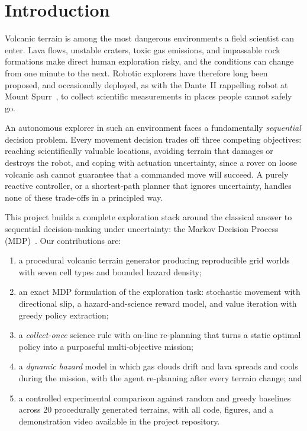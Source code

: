 \documentclass[conference]{IEEEtran}
\begin{document}
\section{Introduction}

Volcanic terrain is among the most dangerous environments a field scientist can enter. Lava flows, unstable craters, toxic gas emissions, and impassable rock formations make direct human exploration risky, and the conditions can change from one minute to the next. Robotic explorers have therefore long been proposed, and occasionally deployed, as with the Dante~II rappelling robot at Mount Spurr~\cite{bares1999dante}, to collect scientific measurements in places people cannot safely go.

An autonomous explorer in such an environment faces a fundamentally \emph{sequential} decision problem. Every movement decision trades off three competing objectives: reaching scientifically valuable locations, avoiding terrain that damages or destroys the robot, and coping with actuation uncertainty, since a rover on loose volcanic ash cannot guarantee that a commanded move will succeed. A purely reactive controller, or a shortest-path planner that ignores uncertainty, handles none of these trade-offs in a principled way.

This project builds a complete exploration stack around the classical answer to sequential decision-making under uncertainty: the Markov Decision Process (MDP)~\cite{bellman1957,puterman1994}. Our contributions are:

\begin{enumerate}
  \item a procedural volcanic terrain generator producing reproducible grid worlds with seven cell types and bounded hazard density;
  \item an exact MDP formulation of the exploration task: stochastic movement with directional slip, a hazard-and-science reward model, and value iteration with greedy policy extraction;
  \item a \emph{collect-once} science rule with on-line re-planning that turns a static optimal policy into a purposeful multi-objective mission;
  \item a \emph{dynamic hazard} model in which gas clouds drift and lava spreads and cools during the mission, with the agent re-planning after every terrain change; and
  \item a controlled experimental comparison against random and greedy baselines across 20 procedurally generated terrains, with all code, figures, and a demonstration video available in the project repository.
\end{enumerate}
\end{document}
